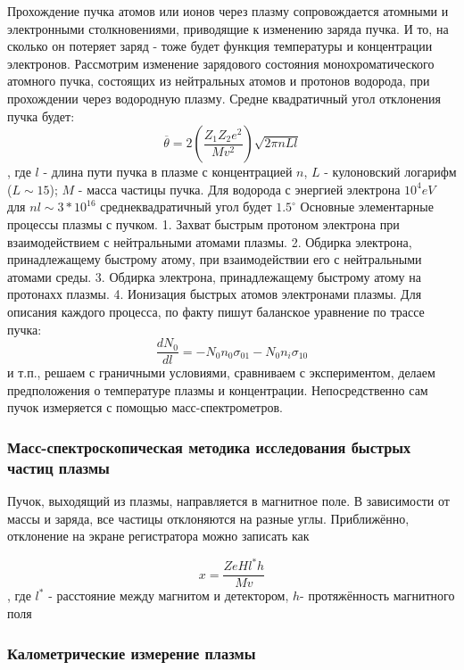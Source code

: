 \documentclass[10pt, a4paper]{article}
\begin{document}
Прохождение пучка атомов или ионов через плазму сопровождается атомными и электронными столкновениями, приводящие к изменению заряда пучка. И то, на сколько он потеряет заряд - тоже будет функция температуры и концентрации электронов.
Рассмотрим изменение зарядового состояния монохроматического атомного пучка, состоящих из нейтральных атомов и протонов водорода, при прохождении через водородную плазму.
Средне квадратичный угол отклонения пучка будет:
\begin{equation}
 \overline{\theta} = 2 (\frac{Z_1 Z_2 e^{2}}{M v^2}) \sqrt{2 \pi nLl}
\end{equation}
, где $l$ - длина пути пучка в плазме с концентрацией $n$, $L$ - кулоновский логарифм ($L \sim 15$); $M$ - масса частицы пучка.
Для водорода с энергией электрона $10^{4} eV$ для $nl \sim 3*10^{16}$ среднеквадратичный угол будет $1.5^{\circ}$ 
Основные элементарные процессы плазмы с пучком.
1. Захват быстрым протоном электрона при взаимодействием с нейтральными атомами плазмы.
2. Обдирка электрона, принадлежащему быстрому атому, при взаимодействии его с нейтральными атомами среды.
3. Обдирка электрона, принадлежащему быстрому атому на протонахх плазмы.
4. Ионизация быстрых атомов электронами плазмы. 
Для описания каждого процесса, по факту пишут баланское уравнение по трассе пучка:
\begin{equation}
	\frac{dN_0}{dl} = -N_0 n_0 \sigma_{01}-N_0 n_i \sigma_{10} 
\end{equation}
и т.п., решаем с граничными условиями, сравниваем с экспериментом, делаем предположения о температуре плазмы и концентрации. Непосредственно сам пучок измеряется с помощью масс-спектрометров.


\subsubsection{Масс-спектроскопическая методика исследования быстрых частиц плазмы}

 Пучок, выходящий из плазмы, направляется в магнитное поле. В зависимости от массы и заряда, все частицы отклоняются на разные углы. Приближённо, отклонение на экране регистратора можно записать как
 
 \begin{equation}
 	x=\frac{ZeHl^{*}h}{Mv}
 \end{equation}
, где $l^{*}$ - расстояние между магнитом и детектором, $h$- протяжённость магнитного поля

\subsubsection{Калометрические измерение плазмы}
\end{document}

